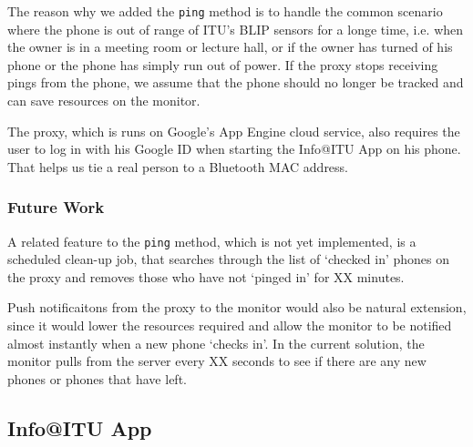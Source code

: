 \documentclass{ubicomp2011}
\begin{document}
The reason why we added the \texttt{ping} method is to handle the common scenario where the phone is out of range of ITU's BLIP sensors for a longe time, i.e. when the owner is in a meeting room or lecture hall, or if the owner has turned of his phone or the phone has simply run out of power. If the proxy stops receiving pings from the phone, we assume that the phone should no longer be tracked and can save resources on the monitor.

The proxy, which is runs on Google's App Engine cloud service, also requires the user to log in with his Google ID when starting the Info@ITU App on his phone. That helps us tie a real person to a Bluetooth MAC address.

\subsubsection{Future Work}
A related feature to the \texttt{ping} method, which is not yet implemented, is a scheduled clean-up job, that searches through the list of `checked in' phones on the proxy and removes those who have not `pinged in' for XX minutes.

Push notificaitons from the proxy to the monitor would also be natural extension, since it would lower the resources required and allow the monitor to be notified almost instantly when a new phone `checks in'. In the current solution, the monitor pulls from the server every XX seconds to see if there are any new phones or phones that have left.

\subsection{Info@ITU App}
\end{document}
